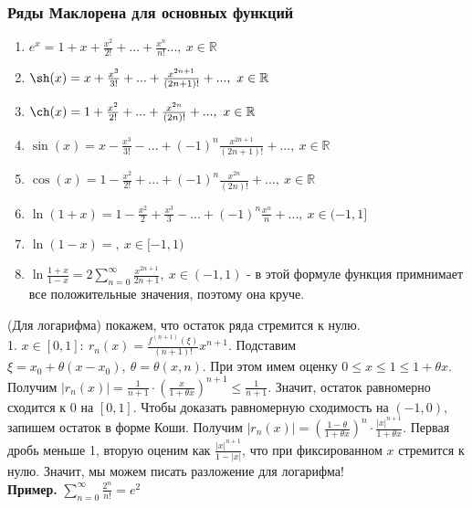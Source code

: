 \subsubsection{Ряды Маклорена для основных функций}
\begin{enumerate}
    \item $e^x=1+x+\frac{x^2}{2!}+...+\frac{x^n}{n!}...,~x\in\mathbb{R}$
\item $\sh(x)=x+\frac{x^3}{3!}+...+\frac{x^{2n+1}}{(2n+1)!}+...,~
x\in\mathbb{R}$
\item $\ch(x)=1+\frac{x^2}{2!}+...+\frac{x^{2n}}{(2n)!}+...,~x\in\mathbb{R}$
\item $\sin(x)=x-\frac{x^3}{3!}-...+(-1)^n\frac{x^{2n+1}}{(2n+1)!}+...,
    ~x\in \mathbb{R}$
\item $\cos(x)=1-\frac{x^2}{2!}+...+(-1)^n \frac{x^{2n}}{(2n)!}+...,~
    x\in\mathbb{R}$ 
\item $\ln(1+x)=1-\frac{x^2}{2}+\frac{x^3}{3}-...+(-1)^n
    \frac{x^n}{n}+...,~x\in(-1,1]$
\item $\ln(1-x)=,~x\in[-1,1)$
\item $\ln \frac{1+x}{1-x}=2 \sum\limits_{n=0}^{\infty} \frac{x^{2n+1}}
    {2n+1},~ x\in(-1,1)$ - в этой формуле функция примнимает все положительные
значения, поэтому она круче. 

\end{enumerate}
(Для логарифма) покажем, что остаток ряда стремится к нулю.\\
1. $x\in[0,1]:~r_n(x)=\frac{f^{(n+1)}(\xi)}{(n+1)!}x^{n+1}$. 
Подставим $\xi=x_0+\theta(x-x_0),~\theta=\theta(x,n)$.
При этом имем оценку $0\leqslant x\leqslant 1\leqslant 1+\theta x$.
Получим
$|r_n(x)|=\frac{1}{n+1}\cdot \left( \frac{x}{1+\theta x} \right)^{n+1}
\leqslant \frac{1}{n+1}$. Значит, остаток равномерно сходится к 0 на $[0,1]$.
Чтобы доказать равномерную сходимость на  $(-1,0)$, запишем остаток в 
форме Коши. Получим  $|r_n(x)|=\left( \frac{1-\theta}{1+\theta x} \right)^n
\cdot \frac{|x|^{n+1}}{1+\theta x}$. Первая дробь меньше 1, вторую 
оценим как $\frac{|x|^{n+1}}{1-{|x|}}$, что при фиксированном $x$ стремится 
к нулю.
Значит, мы можем писать разложение для логарифма!\\
\textbf{Пример.} $\sum\limits_{n=0}^{\infty} \frac{2^n}{n!}=e^2$


